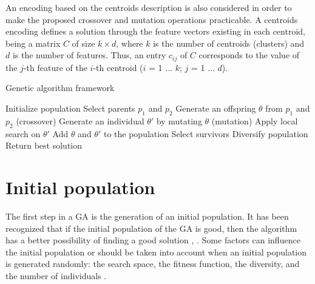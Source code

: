 An encoding based on the centroids description is also considered in order to make the proposed crossover and mutation operations practicable. A centroids encoding defines a solution through the feature vectors existing in each centroid, being a matrix $C$ of size $k \times d$, where $k$ is the number of centroids (clusters) and $d$ is the number of features. Thus, an entry $c_{ij}$ of $C$ corresponds to the value of the $j$-th feature of the $i$-th centroid ($i$ = 1 ... $k$; $j$ = 1 ... $d$).


\begin{algorithm}[H]
\caption{Genetic algorithm framework}
\label{genetic-algo}
\begin{algorithmic}[1]
\STATE Initialize population
\STATE Select parents $p_1$ and $p_2$
\STATE Generate an offspring $\theta$ from $p_1$ and $p_2$ (crossover)
\STATE Generate an individual $\theta'$ by mutating $\theta$ (mutation)
\STATE Apply local search on $\theta'$
\STATE Add $\theta$ and $\theta'$ to the population
\STATE Select survivors
\STATE Diversify population
\ENDIF
\ENDIF
\ENDWHILE
\STATE Return best solution
\end{algorithmic}
\end{algorithm}

\section{Initial population}
The first step in a GA is the generation of an initial population. It has been recognized that if the initial population of the GA is good, then the algorithm has a better possibility of finding a good solution \cite{Burke2004}, \cite{Zitzler2000}. Some factors can influence the initial population or should be taken into account when an initial population is generated randomly: the search space, the fitness function, the diversity, and the number of individuals \cite{DiazGomez2007}.

